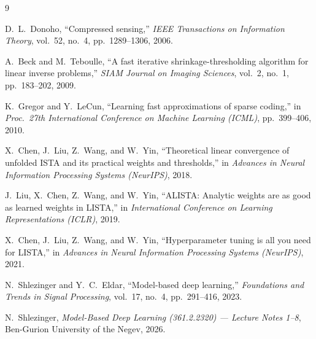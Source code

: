 \documentclass[12pt,a4paper]{article}
\begin{document}
\begin{thebibliography}{9}
\setlength{\itemsep}{2pt}

D.~L.~Donoho,
``Compressed sensing,''
\emph{IEEE Transactions on Information Theory}, vol.~52, no.~4, pp.~1289--1306, 2006.

A.~Beck and M.~Teboulle,
``A fast iterative shrinkage-thresholding algorithm for linear inverse problems,''
\emph{SIAM Journal on Imaging Sciences}, vol.~2, no.~1, pp.~183--202, 2009.

K.~Gregor and Y.~LeCun,
``Learning fast approximations of sparse coding,''
in \emph{Proc.\ 27th International Conference on Machine Learning (ICML)}, pp.~399--406, 2010.

X.~Chen, J.~Liu, Z.~Wang, and W.~Yin,
``Theoretical linear convergence of unfolded ISTA and its practical weights and thresholds,''
in \emph{Advances in Neural Information Processing Systems (NeurIPS)}, 2018.

J.~Liu, X.~Chen, Z.~Wang, and W.~Yin,
``ALISTA: Analytic weights are as good as learned weights in LISTA,''
in \emph{International Conference on Learning Representations (ICLR)}, 2019.

X.~Chen, J.~Liu, Z.~Wang, and W.~Yin,
``Hyperparameter tuning is all you need for LISTA,''
in \emph{Advances in Neural Information Processing Systems (NeurIPS)}, 2021.

N.~Shlezinger and Y.~C.~Eldar,
``Model-based deep learning,''
\emph{Foundations and Trends in Signal Processing}, vol.~17, no.~4, pp.~291--416, 2023.

N.~Shlezinger, \emph{Model-Based Deep Learning (361.2.2320) --- Lecture Notes 1--8},
Ben-Gurion University of the Negev, 2026.

\end{thebibliography}
\end{document}
